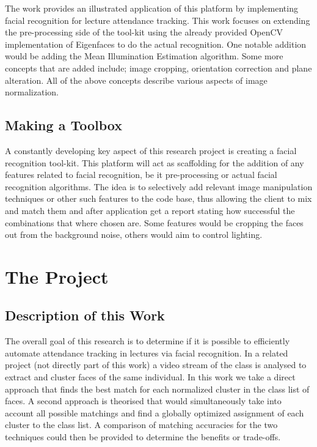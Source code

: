		The work provides an illustrated application of this platform by implementing facial recognition for lecture 
		attendance tracking.  This work focuses on extending the pre-processing side of the tool-kit using the already 
		provided OpenCV implementation of Eigenfaces to do the actual recognition.  One notable addition would be adding 
		the Mean Illumination Estimation algorithm.   Some more concepts that are added include; image cropping, 
		orientation correction and plane alteration.  All of the above concepts describe various aspects of image 
		normalization.
		
	\subsection{Making a Toolbox}
		A constantly developing key aspect of this research project is creating a facial recognition tool-kit.  
		This platform will act as scaffolding for the addition of any features related to facial recognition, be it 
		pre-processing or actual facial recognition algorithms.  The idea is to selectively add relevant image 
		manipulation techniques or other such features to the code base, thus allowing the client to mix and match 
		them and after application get a report stating how successful the combinations that where chosen are.  Some features 
		would be cropping the faces out from the background noise, others would aim to control lighting.   \\
			
			
\section{The Project}
	\subsection{Description of this Work}
		The overall goal of this research is to determine if it is possible to efficiently automate attendance tracking 
		in lectures via facial recognition.  In a related project (not directly part of this work) a video stream of the 
		class is analysed to extract and cluster faces of the same individual.  In this work we take a direct approach that 
		finds the best match for each normalized cluster in the class list of faces.  A second approach is theorised that 
		would simultaneously take into account all possible matchings and find a globally optimized assignment of each 
		cluster to the class list. A comparison of matching accuracies for the two techniques could then be provided to 
		determine the benefits or trade-offs.

